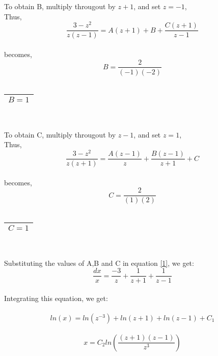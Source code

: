 \documentclass{article}
\begin{document}
To obtain B, multiply througout by $z+1$, and set $z=-1$,\\
Thus,\\
\[\frac{3-z^2}{z(z-1)}=A(z+1)+B+\frac{C(z+1)}{z-1}\]\\
becomes,\\
\[B=\frac{2}{(-1)(-2)}\]\\
\begin{center}
\begin{tabular}{|c|}
\hline
$B=1$\\
\hline
\end{tabular}\\
\end{center}
To obtain C, multiply througout by $z-1$, and set $z=1$,\\
Thus,\\
\[\frac{3-z^2}{z(z+1)}=\frac{A(z-1)}{z}+\frac{B(z-1)}{z+1}+C\]\\
becomes,\\
\[C=\frac{2}{(1)(2)}\]\\
\begin{center}
\begin{tabular}{|c|}
\hline
$C=1$\\
\hline
\end{tabular}\\
\end{center}

Substituting the values of A,B and C in equation \eqref{1}, we get:
\[\frac{dx}{x}=\frac{-3}{z}+\frac{1}{z+1}+\frac{1}{z-1}\]\\
Integrating this equation, we get:\\
\\\[ln(x)=ln(z^{-3})+ln(z+1)+ln(z-1)+C_1\]
\\\[x=C_2ln\left(\frac{(z+1)(z-1)}{z^3}\right)\]
\end{document}
